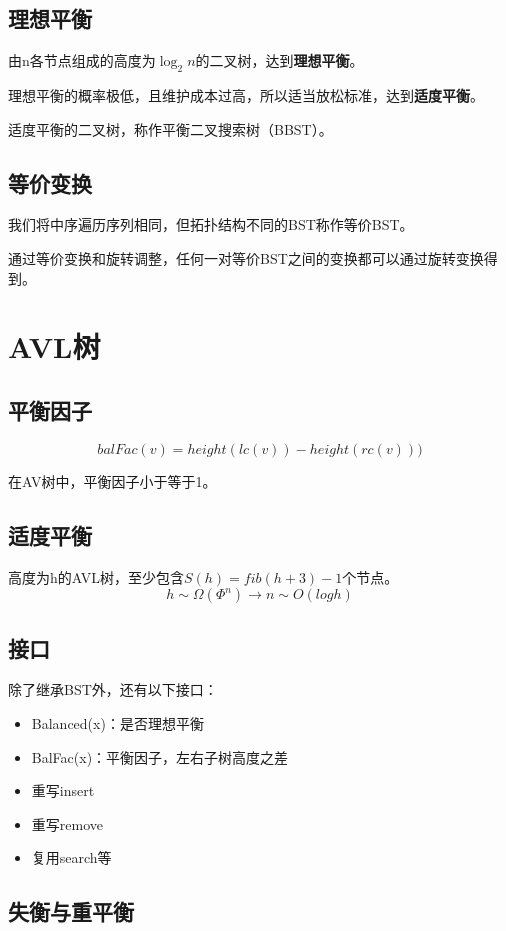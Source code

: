\documentclass{article}
\begin{document}
\subsection{理想平衡}
由n各节点组成的高度为$\log_2n$的二叉树，达到\textbf{理想平衡}。

理想平衡的概率极低，且维护成本过高，所以适当放松标准，达到\textbf{适度平衡}。

适度平衡的二叉树，称作平衡二叉搜索树（BBST）。

\subsection{等价变换}

我们将中序遍历序列相同，但拓扑结构不同的BST称作等价BST。

通过等价变换和旋转调整，任何一对等价BST之间的变换都可以通过旋转变换得到。

\section{AVL树}
\subsection{平衡因子}

$$balFac(v) = height(lc(v)) - height(rc(v)))$$

在AV树中，平衡因子小于等于1。

\subsection{适度平衡}

高度为h的AVL树，至少包含$S(h) = fib(h+3) - 1$个节点。
$$h \sim \Omega(\Phi^n) \rightarrow n \sim O(log h)$$

\subsection{接口}
除了继承BST外，还有以下接口：
\begin{itemize}
  \item Balanced(x)：是否理想平衡
  \item BalFac(x)：平衡因子，左右子树高度之差
  \item 重写insert
  \item 重写remove
  \item 复用search等
\end{itemize}

\subsection{失衡与重平衡}
\end{document}
